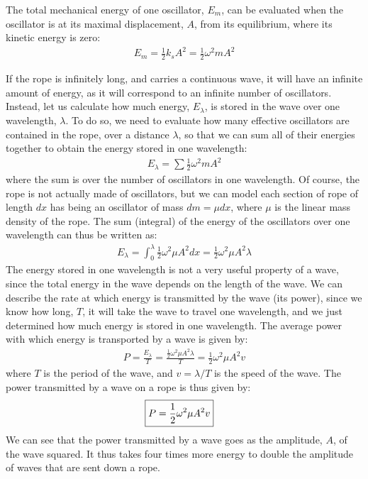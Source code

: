 The total mechanical energy of one oscillator, $E_m$, can be evaluated when the oscillator is at its maximal displacement, $A$, from its equilibrium, where its kinetic energy is zero:
\begin{align*}
E_m = \frac{1}{2}k_s A^2 = \frac{1}{2}\omega^2 m A^2
\end{align*}

If the rope is infinitely long, and carries a continuous wave, it will have an infinite amount of energy, as it will correspond to an infinite number of oscillators. Instead, let us calculate how much energy, $E_\lambda$, is stored in the wave over one wavelength, $\lambda$. To do so, we need to evaluate how many effective oscillators are contained in the rope, over a distance $\lambda$, so that we can sum all of their energies together to obtain the energy stored in one wavelength:
\begin{align*}
E_\lambda = \sum \frac{1}{2}\omega^2 m A^2
\end{align*} 
where the sum is over the number of oscillators in one wavelength. Of course, the rope is not actually made of oscillators, but we can model each section of rope of length $dx$ has being an oscillator of mass $dm=\mu dx$, where $\mu$ is the linear mass density of the rope. The sum (integral) of the energy of the oscillators over one wavelength can thus be written as:
\begin{align*}
E_\lambda = \int_0^\lambda \frac{1}{2}\omega^2 \mu A^2 dx =  \frac{1}{2}\omega^2 \mu A^2 \lambda
\end{align*}
The energy stored in one wavelength is not a very useful property of a wave, since the total energy in the wave depends on the length of the wave. We can describe the rate at which energy is transmitted by the wave (its power), since we know how long, $T$, it will take the wave to travel one wavelength, and we just determined how much energy is stored in one wavelength. The average power with which energy is transported by a wave is given by:
\begin{align*}
P = \frac{E_\lambda}{T} = \frac{\frac{1}{2}\omega^2 \mu A^2 \lambda}{T}=\frac{1}{2}\omega^2 \mu A^2 v
\end{align*}
where $T$ is the period of the wave, and $v=\lambda/T$ is the speed of the wave. The power transmitted by a wave on a rope is thus given by:
\begin{align}
\Aboxed{P=\frac{1}{2}\omega^2 \mu A^2 v}
\end{align}
We can see that the power transmitted by a wave goes as the amplitude, $A$, of the wave squared. It thus takes four times more energy to double the amplitude of waves that are sent down a rope. 

